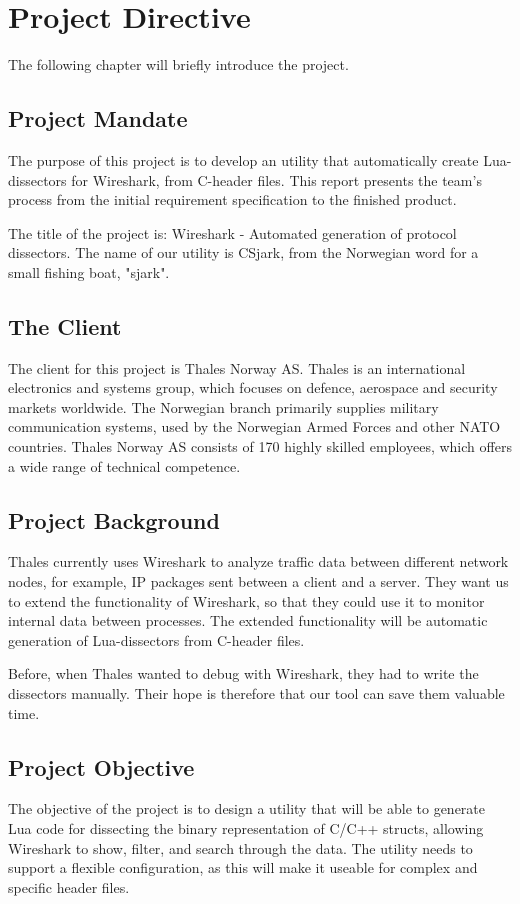 \chapter{Project Directive}

The following chapter will briefly introduce the project.     

\section{Project Mandate}
The purpose of this project is to develop an utility that automatically create Lua-dissectors for Wireshark, from C-header files. This report presents the team’s process from the initial requirement specification to the finished product. 

The title of the project is: Wireshark - Automated generation of protocol dissectors. The name of our utility is CSjark, from the Norwegian word for a small fishing boat, "sjark".

\section{The Client}
The client for this project is Thales Norway AS. Thales is an international electronics and systems group, which focuses on defence, aerospace and security markets worldwide. The Norwegian branch primarily supplies military communication systems, used by the Norwegian Armed Forces and other NATO countries. Thales Norway AS consists of 170 highly skilled employees, which offers a wide range of technical competence.

\section{Project Background}
Thales currently uses Wireshark to analyze traffic data between different network nodes, for example, IP packages sent between a client and a server.
They want us to extend the functionality of Wireshark, so that they could use it to monitor internal data between processes. The extended functionality will be automatic generation of Lua-dissectors from C-header files.

Before, when Thales wanted to debug with Wireshark, they had to write the dissectors manually. Their hope is therefore that our tool can save them valuable time.


\section{Project Objective}
The objective of the project is to design a utility that will be able to generate Lua code for dissecting the binary representation of C/C++ structs, allowing Wireshark to show, filter, and search through the data.
The utility needs to support a flexible configuration, as this will make it useable for complex and specific header files. 

